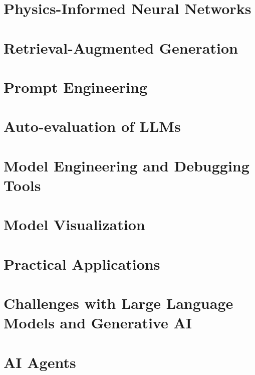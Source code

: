 \documentclass[12pt]{book}
\begin{document}
\chapter{Physics-Informed Neural Networks}


\chapter{Retrieval-Augmented Generation}


\chapter{Prompt Engineering}


\chapter{Auto-evaluation of LLMs}


\chapter{Model Engineering and Debugging Tools}


\chapter{Model Visualization}


\chapter{Practical Applications}


\chapter{Challenges with Large Language Models and Generative AI}


\chapter{AI Agents}

\end{document}
